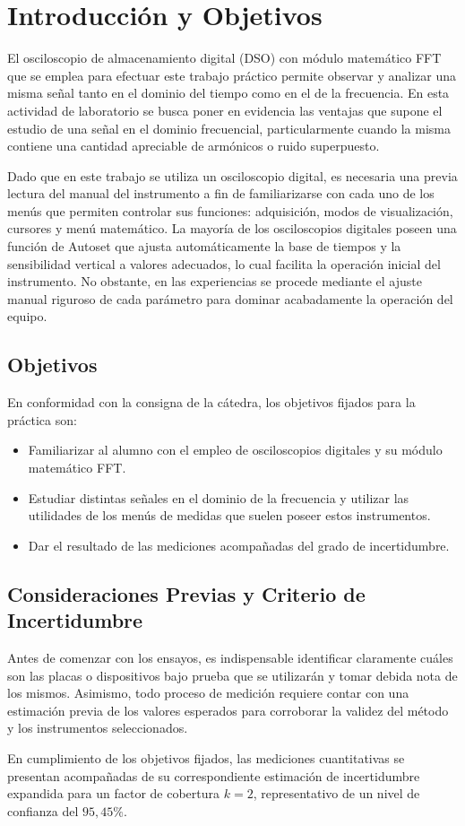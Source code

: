 \chapter{Introducción y Objetivos}

El osciloscopio de almacenamiento digital (DSO) con módulo matemático FFT que se emplea para efectuar este trabajo
práctico permite observar y analizar una misma señal tanto en el dominio del tiempo como en el de la frecuencia.
En esta actividad de laboratorio se busca poner en evidencia las ventajas que supone el estudio de una señal en el
dominio frecuencial, particularmente cuando la misma contiene una cantidad apreciable de armónicos o ruido superpuesto.

Dado que en este trabajo se utiliza un osciloscopio digital, es necesaria una previa lectura del manual del instrumento
a fin de familiarizarse con cada uno de los menús que permiten controlar sus funciones: adquisición, modos de visualización,
cursores y menú matemático.
La mayoría de los osciloscopios digitales poseen una función de Autoset que ajusta automáticamente la base de tiempos y
la sensibilidad vertical a valores adecuados, lo cual facilita la operación inicial del instrumento. No obstante, en las
experiencias se procede mediante el ajuste manual riguroso de cada parámetro para dominar acabadamente la operación del
equipo.

\section{Objetivos}
En conformidad con la consigna de la cátedra, los objetivos fijados para la práctica son:
\begin{itemize}
    \item Familiarizar al alumno con el empleo de osciloscopios digitales y su módulo matemático FFT.
    \item Estudiar distintas señales en el dominio de la frecuencia y utilizar las utilidades de los menús de medidas
    que suelen poseer estos instrumentos.
    \item Dar el resultado de las mediciones acompañadas del grado de incertidumbre.
\end{itemize}

\section{Consideraciones Previas y Criterio de Incertidumbre}
Antes de comenzar con los ensayos, es indispensable identificar claramente cuáles son las placas o dispositivos bajo
prueba que se utilizarán y tomar debida nota de los mismos. Asimismo, todo proceso de medición requiere contar con una
estimación previa de los valores esperados para corroborar la validez del método y los instrumentos seleccionados.

En cumplimiento de los objetivos fijados, las mediciones cuantitativas se presentan acompañadas de su correspondiente
estimación de incertidumbre expandida para un factor de cobertura $k = 2$, representativo de un nivel de confianza del
$95{,}45\%$.
